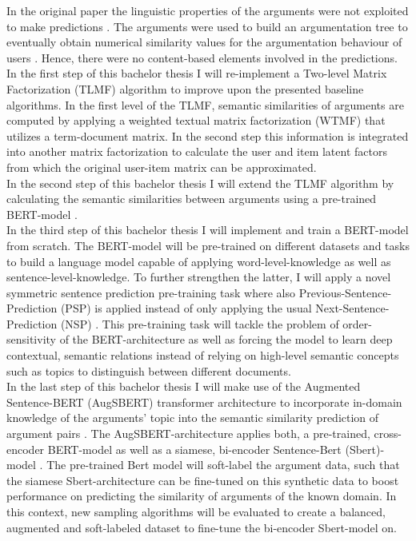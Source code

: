 \documentclass{article}
\begin{document}
In the original paper the linguistic properties of the arguments were not exploited to make predictions \cite{HowIArgue}. 
The arguments were used to build an argumentation tree to eventually obtain numerical similarity
values for the argumentation behaviour of users \cite{brenneis2020much}. Hence, there were no content-based elements involved
in the predictions.\\ 
In the first step of this bachelor thesis I will re-implement a Two-level Matrix Factorization (TLMF) algorithm to improve upon the presented baseline algorithms.\cite{li2016two}
In the first level of the TLMF, semantic similarities of arguments are computed by applying a weighted textual matrix factorization (WTMF) that utilizes a term-document matrix.
In the second step this information is integrated into another matrix factorization to calculate the
user and item latent factors from which the original user-item matrix can be approximated.\\
In the second step of this bachelor thesis I will extend the TLMF algorithm by calculating the semantic similarities between arguments using 
a pre-trained BERT-model \cite{devlin2018bert}.\\
In the third step of this bachelor thesis I will implement and train a BERT-model from scratch. The BERT-model will be pre-trained on different datasets and tasks to build a language model 
capable of applying word-level-knowledge as well as sentence-level-knowledge. To further strengthen the latter, I will apply a novel symmetric sentence prediction pre-training 
task where also Previous-Sentence-Prediction (PSP) is applied instead of only applying the usual Next-Sentence-Prediction (NSP) \cite{xu2020symmetric}.
This pre-training task will tackle the problem of order-sensitivity of the BERT-architecture as well as forcing the model to learn deep contextual, semantic relations instead
of relying on high-level semantic concepts such as topics to distinguish between different documents.\\
In the last step of this bachelor thesis I will make use of the Augmented Sentence-BERT (AugSBERT) transformer architecture to incorporate
in-domain knowledge of the arguments' topic into the semantic similarity prediction of argument pairs \cite{thakur2020augmented}.
The AugSBERT-architecture applies both, a pre-trained, cross-encoder BERT-model as well as a siamese, bi-encoder Sentence-Bert (Sbert)-model \cite{reimers2019sentence}.
The pre-trained Bert model will soft-label the argument data, such that the siamese Sbert-architecture can be fine-tuned
on this synthetic data to boost performance on predicting the similarity of arguments of the known domain.
In this context, new sampling algorithms will be evaluated to create a balanced, augmented and soft-labeled dataset to fine-tune the
bi-encoder Sbert-model on. 

\printbibliography
\end{document}

